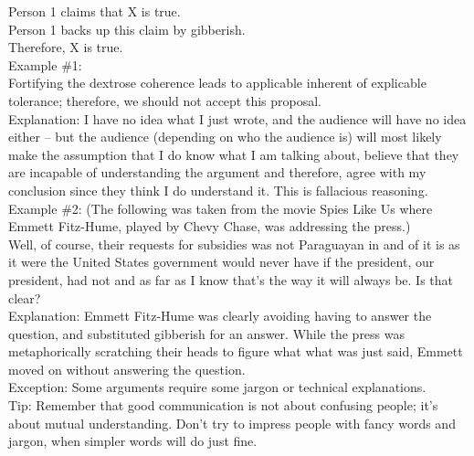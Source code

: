 \documentclass[a4paper,12pt,single,pdftex]{scrartcl}
\begin{document}
    
      Person 1 claims that X is true.
    \\

    
      Person 1 backs up this claim by gibberish.
    \\

    
      Therefore, X is true.
    \\

    
      Example \#1:
    \\

    
      Fortifying the dextrose coherence leads to applicable inherent of explicable tolerance; therefore, we should not accept this proposal.
    \\

    
      Explanation: I have no idea what I just wrote, and the audience will have no idea either -- but the audience (depending on who the audience is) will most likely make the assumption that I do know what I am talking about, believe that they are incapable of understanding the argument and therefore, agree with my conclusion since they think I do understand it.  This is fallacious reasoning.
    \\

    
      Example \#2: (The following was taken from the movie Spies Like Us where Emmett Fitz-Hume, played by Chevy Chase, was addressing the press.)
    \\

    
      Well, of course, their requests for subsidies was not Paraguayan in and of it is as it were the United States government would never have if the president, our president, had not and as far as I know that's the way it will always be. Is that clear?
    \\

    
      Explanation: Emmett Fitz-Hume was clearly avoiding having to answer the question, and substituted gibberish for an answer. While the press was metaphorically scratching their heads to figure what what was just said, Emmett moved on without answering the question.
    \\

    
      Exception: Some arguments require some jargon or technical explanations.
    \\

    
      Tip: Remember that good communication is not about confusing people; it’s about mutual understanding.  Don’t try to impress people with fancy words and jargon, when simpler words will do just fine.
    \\
\end{document}
